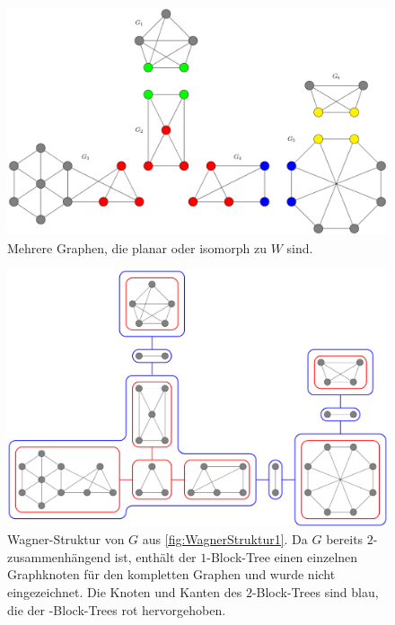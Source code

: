 \begin{figure}[H]
  \centering
  \includegraphics[width=\textwidth,height=\textheight,keepaspectratio]{bilder/WagnerTheorem2.pdf}
  \caption{Mehrere Graphen, die planar oder isomorph zu $W$ sind.}
  \label{fig:WagnerStruktur2}
\end{figure}

\begin{figure}[H]
  \centering
  \includegraphics[width=\textwidth,height=\textheight,keepaspectratio]{bilder/WagnerTheorem3.pdf}
  \caption{Wagner-Struktur von $G$ aus \Abb \ref{fig:WagnerStruktur1}.
           Da $G$ bereits $2$-zusammenhängend ist, enthält der $1$-Block-Tree einen einzelnen Graphknoten für den kompletten Graphen und wurde nicht eingezeichnet.
           Die Knoten und Kanten des $2$-Block-Trees sind blau, die der \dd-Block-Trees rot hervorgehoben.}
  \label{fig:WagnerStruktur3}
\end{figure}

